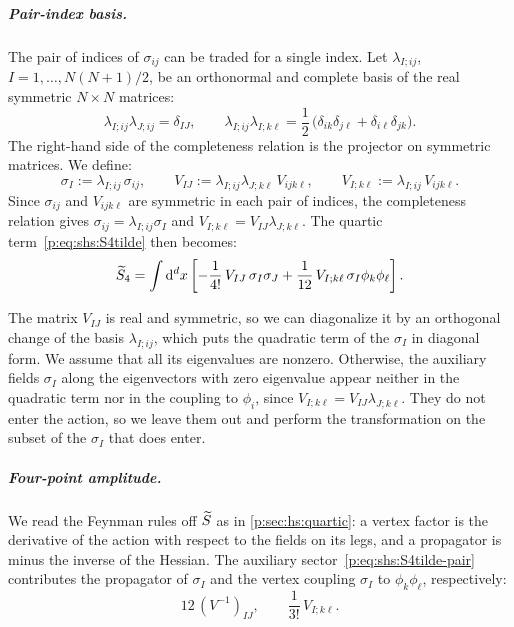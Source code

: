 \subparagraph{Pair-index basis.}

The pair of indices of $\sigma_{ij}$ can be traded for a single index.
Let $\lambda_{I;ij}$, $I = 1, \ldots, N (N + 1) / 2$, be an orthonormal and complete basis of the real symmetric $N \times N$ matrices:
\begin{equation}
\label{p:eq:shs:basis}
\lambda_{I;ij} \lambda_{J;ij}
  = \delta_{IJ},
\qquad
\lambda_{I;ij} \lambda_{I;k\ell}
  = \frac{1}{2} \, \big( \delta_{ik} \delta_{j\ell} + \delta_{i\ell} \delta_{jk} \big).
\end{equation}
The right-hand side of the completeness relation is the projector on symmetric matrices.
We define:
\begin{equation}
\label{p:eq:shs:pair-index}
\sigma_I
  := \lambda_{I;ij} \, \sigma_{ij},
\qquad
V_{IJ}
  := \lambda_{I;ij} \lambda_{J;k\ell} \, V_{ijk\ell},
\qquad
V_{I;k\ell}
  := \lambda_{I;ij} \, V_{ijk\ell}.
\end{equation}
Since $\sigma_{ij}$ and $V_{ijk\ell}$ are symmetric in each pair of indices, the completeness relation gives $\sigma_{ij} = \lambda_{I;ij} \sigma_I$ and $V_{I;k\ell} = V_{IJ} \lambda_{J;k\ell}$.
The quartic term~\eqref{p:eq:shs:S4tilde} then becomes:
\begin{equation}
\label{p:eq:shs:S4tilde-pair}
\caction[4]
  = \int \dd^d x \left[
    - \frac{1}{4!} \, V_{IJ} \, \sigma_I \sigma_J
    + \frac{1}{12} \, V_{I;k\ell} \, \sigma_I \phi_k \phi_\ell
  \right].
\end{equation}

The matrix $V_{IJ}$ is real and symmetric, so we can diagonalize it by an orthogonal change of the basis $\lambda_{I;ij}$, which puts the quadratic term of the $\sigma_I$ in diagonal form.
We assume that all its eigenvalues are nonzero.
Otherwise, the auxiliary fields $\sigma_I$ along the eigenvectors with zero eigenvalue appear neither in the quadratic term nor in the coupling to $\phi_i$, since $V_{I;k\ell} = V_{IJ} \lambda_{J;k\ell}$.
They do not enter the action, so we leave them out and perform the transformation on the subset of the $\sigma_I$ that does enter.


\subparagraph{Four-point amplitude.}

We read the Feynman rules off $\caction$ as in \cref{p:sec:hs:quartic}: a vertex factor is the derivative of the action with respect to the fields on its legs, and a propagator is minus the inverse of the Hessian.
The auxiliary sector~\eqref{p:eq:shs:S4tilde-pair} contributes the propagator of $\sigma_I$ and the vertex coupling $\sigma_I$ to $\phi_k \phi_\ell$, respectively:
\begin{equation}
\label{p:eq:shs:feynman-rules}
12 \, (V^{-1})_{IJ},
\qquad
\frac{1}{3!} \, V_{I;k\ell}.
\end{equation}

